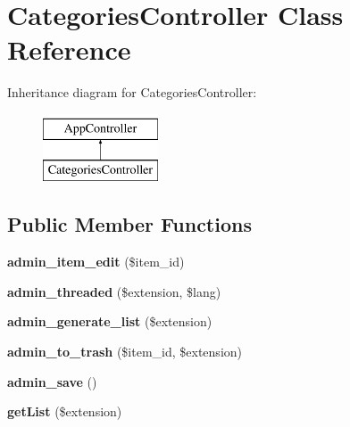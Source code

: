 \hypertarget{class_categories_controller}{
\section{\-Categories\-Controller \-Class \-Reference}
\label{class_categories_controller}
}
\-Inheritance diagram for \-Categories\-Controller\-:\begin{figure}[H]
\begin{center}
\leavevmode
\includegraphics[height=2.000000cm]{class_categories_controller}
\end{center}
\end{figure}
\subsection*{\-Public \-Member \-Functions}
\begin{DoxyCompactItemize}
\item 
\hypertarget{class_categories_controller_a062c83ecd4787750b390b9fcf09f8f9a}{
{\bfseries admin\-\_\-item\-\_\-edit} (\$item\-\_\-id)}
\label{class_categories_controller_a062c83ecd4787750b390b9fcf09f8f9a}

\item 
\hypertarget{class_categories_controller_aafda0171be86b56020be301149f0e9a8}{
{\bfseries admin\-\_\-threaded} (\$extension, \$lang)}
\label{class_categories_controller_aafda0171be86b56020be301149f0e9a8}

\item 
\hypertarget{class_categories_controller_ae1188eeb7e8e910273c617a801b6ea73}{
{\bfseries admin\-\_\-generate\-\_\-list} (\$extension)}
\label{class_categories_controller_ae1188eeb7e8e910273c617a801b6ea73}

\item 
\hypertarget{class_categories_controller_a3a0567c8e8506a75012dab09508dceec}{
{\bfseries admin\-\_\-to\-\_\-trash} (\$item\-\_\-id, \$extension)}
\label{class_categories_controller_a3a0567c8e8506a75012dab09508dceec}

\item 
\hypertarget{class_categories_controller_a9555daefb6b4915cda349afb03589471}{
{\bfseries admin\-\_\-save} ()}
\label{class_categories_controller_a9555daefb6b4915cda349afb03589471}

\item 
\hypertarget{class_categories_controller_ae1ed24d196ad30683bd3e5982cc53e00}{
{\bfseries get\-List} (\$extension)}
\label{class_categories_controller_ae1ed24d196ad30683bd3e5982cc53e00}

\end{DoxyCompactItemize}
